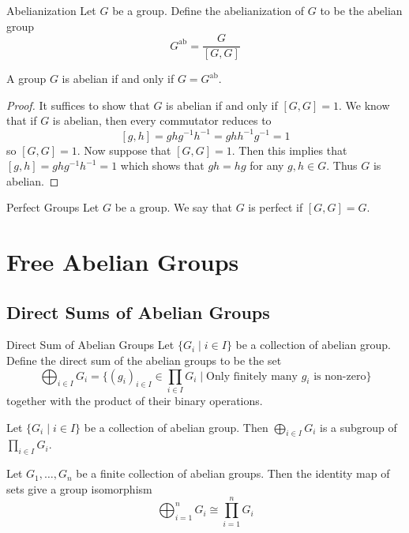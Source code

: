 \documentclass[a4paper]{article}
\begin{document}
\begin{defn}{Abelianization}{} Let $G$ be a group. Define the abelianization of $G$ to be the abelian group $$G^\text{ab}=\frac{G}{[G,G]}$$
\end{defn}

\begin{prp}{}{} A group $G$ is abelian if and only if $G=G^\text{ab}$. \tcbline
\begin{proof}
It suffices to show that $G$ is abelian if and only if $[G,G]=1$. We know that if $G$ is abelian, then every commutator reduces to $$[g,h]=ghg^{-1}h^{-1}=ghh^{-1}g^{-1}=1$$ so $[G,G]=1$. Now suppose that $[G,G]=1$. Then this implies that $[g,h]=ghg^{-1}h^{-1}=1$ which shows that $gh=hg$ for any $g,h\in G$. Thus $G$ is abelian. 
\end{proof}
\end{prp}

\begin{defn}{Perfect Groups}{} Let $G$ be a group. We say that $G$ is perfect if $[G,G]=G$. 
\end{defn}

\pagebreak
\section{Free Abelian Groups}
\subsection{Direct Sums of Abelian Groups}
\begin{defn}{Direct Sum of Abelian Groups}{} Let $\{G_i\;|\;i\in I\}$ be a collection of abelian group. Define the direct sum of the abelian groups to be the set $$\bigoplus_{i\in I}G_i=\{(g_i)_{i\in I}\in\prod_{i\in I}G_i\;|\;\text{Only finitely many }g_i\text{ is non-zero}\}$$ together with the product of their binary operations. 
\end{defn}

\begin{lmm}{}{} Let $\{G_i\;|\;i\in I\}$ be a collection of abelian group. Then $\bigoplus_{i\in I}G_i$ is a subgroup of $\prod_{i\in I}G_i$. 
\end{lmm}

\begin{lmm}{}{} Let $G_1,\dots,G_n$ be a finite collection of abelian groups. Then the identity map of sets give a group isomorphism $$\bigoplus_{i=1}^nG_i\cong\prod_{i=1}^nG_i$$
\end{lmm}
\end{document}
